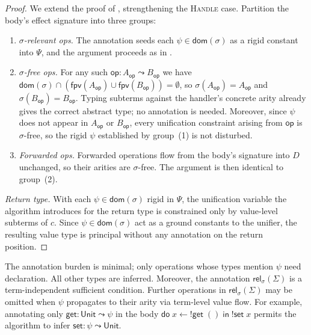 \documentclass[acmsmall,screen,review,anonymous]{acmart}
\newcommand{\unit}{\mathsf{Unit}}
\newcommand{\op}{\mathsf{op}}
\newcommand{\ddo}{\mathsf{do}\;}
\newcommand{\iin}{\;\mathsf{in}\;}
\newcommand{\dom}{\mathsf{dom}}
\newcommand{\Sig}{\Sigma}
\newcommand{\fpv}{\mathsf{fpv}}
\newcommand{\rel}{\mathsf{rel}}
\begin{document}
\begin{proof}
  We extend the proof of , strengthening the \textsc{Handle} case.
  Partition the body's effect signature into three groups:

  \begin{enumerate}
    \item \emph{$\sigma$-relevant ops.}
          The annotation seeds each $\psi \in \dom(\sigma)$ as a rigid constant
          into $\Psi$, and the argument proceeds as in .

    \item \emph{$\sigma$-free ops.}
          For any such $\op : A_\op \leadsto B_\op$ we have
          $\dom(\sigma) \cap (\fpv(A_\op) \cup \fpv(B_\op)) = \emptyset$,
          so $\sigma(A_\op) = A_\op$ and $\sigma(B_\op) = B_\op$.
          Typing subterms against the handler's concrete arity already gives the correct
          abstract type; no annotation is needed.
          Moreover, since $\psi$ does not appear in $A_\op$ or $B_\op$, every unification
          constraint arising from $\op$ is $\sigma$-free, so the rigid $\psi$
          established by group~(1) is not disturbed.

    \item \emph{Forwarded ops.}
          Forwarded operations flow from the body's signature into $D$ unchanged, so
          their arities are $\sigma$-free.
          The argument is then identical to group~(2).
  \end{enumerate}
  \emph{Return type.}
  With each $\psi\in\dom(\sigma)$ rigid in $\Psi$, the unification variable the algorithm introduces
  for the return type is constrained only by value-level subterms of $c$.
  Since $\psi\in\dom(\sigma)$ act as a ground constants to the unifier, the resulting value type is
  principal without any annotation on the return position.
\end{proof}

The annotation burden is minimal; only operations whose types mention $\psi$ need declaration.
All other types are inferred.
Moreover, the annotation $\rel_\sigma(\Sig)$ is a term-independent sufficient condition.
Further operations in $\rel_\sigma(\Sig)$ may be omitted when $\psi$ propagates to their arity via term-level value flow.
For example, annotating only $\mathsf{get} : \unit \leadsto \psi$ in the body
$\ddo x \leftarrow {!}\mathsf{get}\; () \iin {!}\mathsf{set}\;x$
permits the algorithm to infer $\mathsf{set} : \psi \leadsto \unit$.
\end{document}
